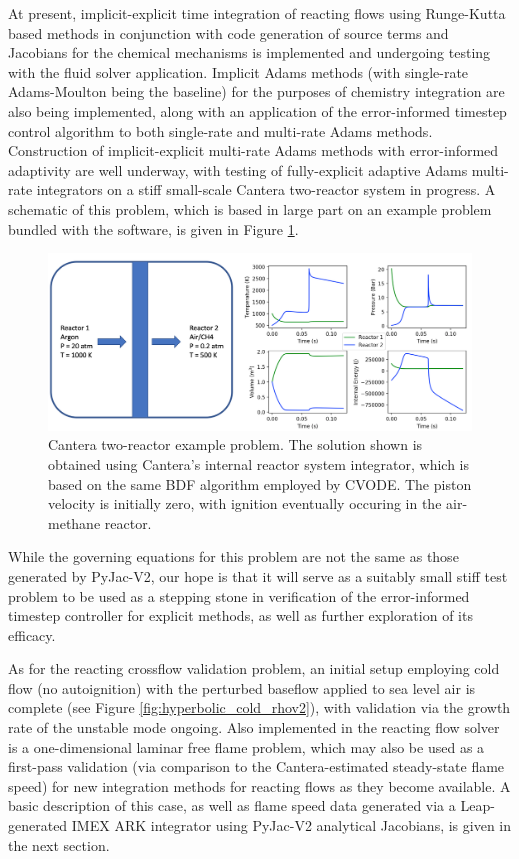 At present, implicit-explicit time integration of reacting flows using Runge-Kutta
based methods in conjunction with code generation of source terms and Jacobians for
the chemical mechanisms is implemented and undergoing testing with the fluid solver
application. Implicit Adams methods (with single-rate Adams-Moulton being the baseline)
for the purposes of chemistry integration are also being implemented, along with
an application of the error-informed timestep control algorithm to both
single-rate and multi-rate Adams methods. Construction of implicit-explicit multi-rate
Adams methods with error-informed adaptivity are well underway, with testing
of fully-explicit adaptive Adams multi-rate integrators on a stiff small-scale Cantera
\cite{cantera} two-reactor system in progress. A schematic of this problem, which is
based in large part on an example problem bundled with the software, is given in
Figure \ref{fig:cantera_reactors}.
\begin{figure}
\centering
\includegraphics[width=0.8\linewidth,trim=4 4 4 4,clip]{figures/cantera_reactors_soln.png}
\caption{Cantera two-reactor example problem. The solution shown is obtained using
	 Cantera's internal reactor system integrator, which is based on the same
	 BDF algorithm employed by CVODE. The piston velocity is initially zero,
	 with ignition eventually occuring in the air-methane reactor.}
\label{fig:cantera_reactors}
\end{figure}
While the governing equations for this problem are not the same as those generated
by PyJac-V2, our hope is that it will serve as a suitably small stiff test problem to be
used as a stepping stone in verification of the error-informed timestep controller
for explicit methods, as well as further exploration of its efficacy.

As for the reacting crossflow validation problem, an initial setup employing
cold flow (no autoignition) with the perturbed baseflow applied to sea level air
is complete (see Figure \ref{fig:hyperbolic_cold_rhov2}), with validation via the
growth rate of the unstable mode ongoing. Also implemented in the reacting flow
solver is a one-dimensional laminar free flame problem, which may also be used
as a first-pass validation (via comparison to the Cantera-estimated steady-state
flame speed) for new integration methods for reacting flows as they become available.
A basic description of this case, as well as flame speed data generated via a Leap-generated
IMEX ARK integrator using PyJac-V2 analytical Jacobians, is given in the next section.

